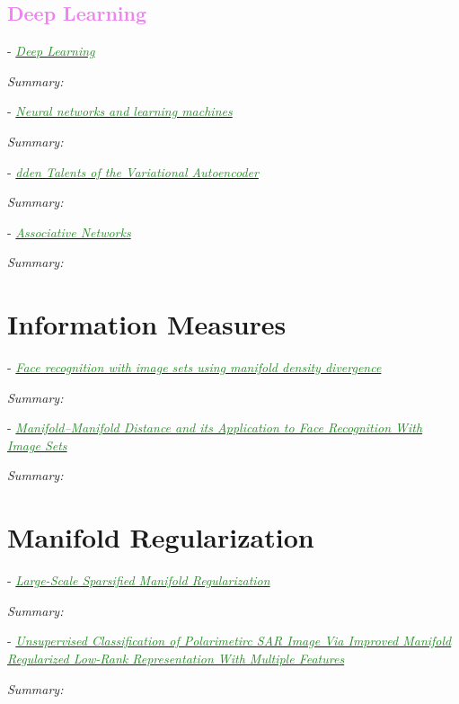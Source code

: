 \documentclass[]{article}
\newcommand{\paperentry}[4]{
            \hangindent=1cm
            \textcolor{red}{\cite{#1}} - \href{run:../References/#3}{\textcolor{ForestGreen}{\textit{#2}}}
            
            \noindent            
            \begin{minipage}[t]{0.1\linewidth}\hfill\end{minipage}
            \begin{minipage}[t]{0.8\linewidth}\textcolor{NavyBlue}{{\textit{Summary:}}}#4\end{minipage}
            \vspace{.25cm}
          }
\begin{document}
	\textcolor{Violet}{\subsection{Deep Learning}}
	
		\paperentry{Goodfellow2016DeepLearning}
		{Deep Learning}
		{Manifold_Representation_Learning/Autoencoders/Goodfellow2016DeepLearning.pdf}
		{}
		
		\paperentry{Haykin2009NeuralNetworks}
		{Neural networks and learning machines}
		{Manifold_Representation_Learning/Autoencoders/Haykin2009NeuralNetworks.pdf}
		{}
		
		\paperentry{Dai2017VariationalAutoencoder}
		{dden Talents of the Variational Autoencoder}
		{Manifold_Representation_Learning/Autoencoders/Dai2017VariationalAutoencoder.pdf}
		{}
		
		\paperentry{Rojas1996AssociativeNetworks}
		{Associative Networks}
		{Manifold_Representation_Learning/Autoencoders/Rojas1996AssociativeNetworks.pdf}
		{}

\section{Information Measures}

	\paperentry{Arandjelovic2005FaceRecManifoldDensityDivergence}
	{Face recognition with image sets using manifold density divergence}
	{Manifold_Representation_Learning/Information/Arandjelovic2005FaceRecManifoldDensityDivergence.pdf}
	{}
	
	\paperentry{Wang2008ManifoldManifoldDistance}
	{Manifold–Manifold Distance and its Application to Face Recognition With Image Sets}
	{Manifold_Representation_Learning/Information/Wang2008ManifoldManifoldDistance.pdf}
	{}
	

	
\section{Manifold Regularization}
	\paperentry{Tsang2007ManifoldRegularization}
	{Large-Scale Sparsified Manifold Regularization}
	{Manifold_Representation_Learning/ManifoldRegularization/Tsang2007ManifoldRegularization.pdf}
	{}
	
	\paperentry{Ren2017ManRegSAR}
	{Unsupervised Classification of Polarimetirc SAR Image Via Improved Manifold Regularized Low-Rank Representation With Multiple Features}
	{Manifold_Representation_Learning/ManifoldRegularization/Ren2017ManRegSAR.pdf}
	{}
	
\end{document}
